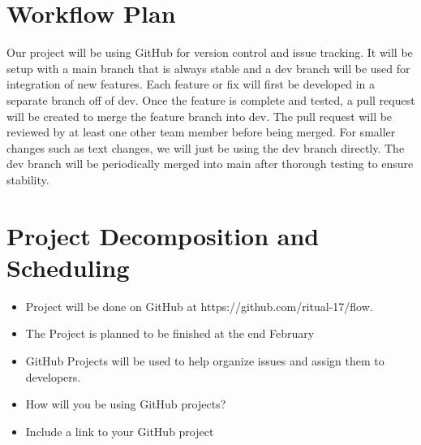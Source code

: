 \documentclass{article}
\begin{document}

\section{Workflow Plan}

	
  
  Our project will be using GitHub for version control and issue tracking. It will be setup with a main branch that is always stable and
  a dev branch will be used for integration of new features. Each feature or fix will first be developed in a separate branch off of dev. 
  Once the feature is complete and tested, a pull request will be created to merge the feature branch into dev. The pull request will be 
  reviewed by at least one other team member before being merged. For smaller changes such as text changes, we will just be using the dev 
  branch directly. The dev branch will be periodically merged into main after thorough testing to ensure stability. 



\section{Project Decomposition and Scheduling}

\begin{itemize}
  \item Project will be done on GitHub at https://github.com/ritual-17/flow.
  \item The Project is planned to be finished at the end February 
  \item GitHub Projects will be used to help organize issues and assign them to developers. 
  \item How will you be using GitHub projects?
  
  \item Include a link to your GitHub project
  
\end{itemize}
\end{document}
